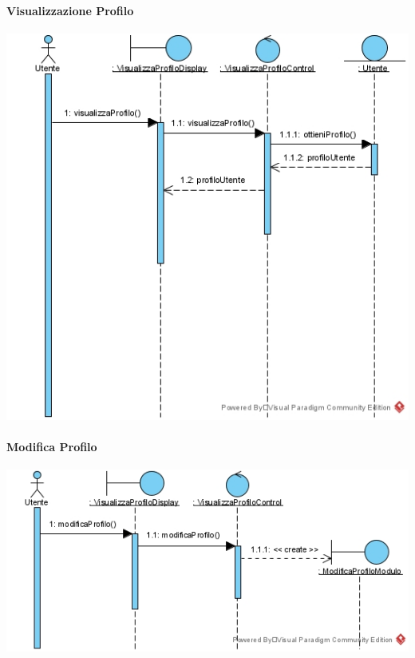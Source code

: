 \paragraph{Visualizzazione Profilo}
\begin{center}
\includegraphics[width=\textwidth,height=\textheight,keepaspectratio]{Figure/SequenceDiagrams/VisualizzazioneProfilo.jpg}
\end{center}

\newpage
\paragraph{Modifica Profilo}
\begin{center}
\includegraphics[width=\textwidth,height=\textheight,keepaspectratio]{Figure/SequenceDiagrams/ModificaProfiloEntry.jpg}
\end{center}

